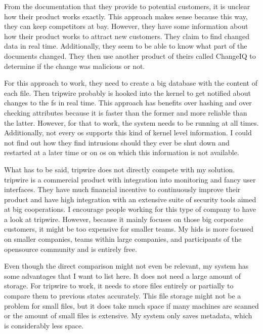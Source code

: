 From the documentation that they provide to potential customers, it is unclear how their product works exactly. This approach makes sense because this way, they can keep competitors at bay. However, they have some information about how their product works to attract new customers. They claim to find changed data in real time. Additionally, they seem to be able to know what part of the documents changed. They then use another product of theirs called ChangeIQ to determine if the change was malicious or not. \cite{tripwire:fim:datasheet, tripwire:true:intent}

For this approach to work, they need to create a big database with the content of each file. Then \gls{tripwire} probably is hooked into the kernel to get notified about changes to the \gls{fs} in real time. This approach has benefits over hashing and over checking attributes because it is faster than the former and more reliable than the latter. However, for that to work, the system needs to be running at all times. Additionally, not every \gls{os} supports this kind of kernel level information. I could not find out how they find intrusions should they ever be shut down and restarted at a later time or on \gls{os} on which this information is not available. 

What has to be said, \gls{tripwire} does not directly compete with my solution. \Gls{tripwire} is a commercial product with integration into monitoring and fancy user interfaces. They have much financial incentive to continuously improve their product and have high integration with an extensive suite of security tools aimed at big cooperations. I encourage people working for this type of company to have a look at \gls{tripwire}. However, because it mainly focuses on those big corporate customers, it might be too expensive for smaller teams. My \gls{hids} is more focused on smaller companies, teams within large companies, and participants of the \gls{opensource} community and is entirely free.

Even though the direct comparison might not even be relevant, my system has some advantages that I want to list here. It does not need a large amount of storage. For tripwire to work, it needs to store files entirely or partially to compare them to previous states accurately. This file storage might not be a problem for small files, but it does take much space if many machines are scanned or the amount of small files is extensive. My system only saves \gls{metadata}, which is considerably less space.


